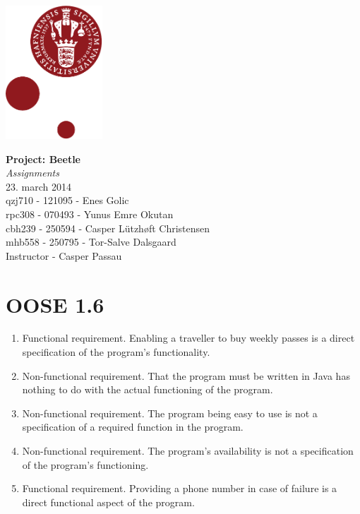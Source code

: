 \documentclass[12pt,a4paper]{article}
\begin{document}
	
	\begin{minipage}[b]{1.0\linewidth} 
		\includegraphics[height=50mm]{KULogo.pdf}
		
		\vspace*{-16ex}
		\vspace {35ex}
		\begin{center}
			{\huge \bf Project: Beetle} \\
			{\huge\textit {Assignments}}\vspace*{4ex} \\
			{\large 23. march 2014}\\
			\vspace*{2ex}
			qzj710 - 121095 - Enes Golic \\
			rpc308 - 070493 - Yunus Emre Okutan \\
			cbh239 - 250594 - Casper Lützhøft Christensen \\
			mhb558 - 250795 - Tor-Salve Dalsgaard\\
			\vspace*{1ex}
			Instructor - Casper Passau
			
		\end{center}
	\end{minipage}
	
\newpage

\section{OOSE 1.6}
\begin{enumerate}
\item Functional requirement. Enabling a traveller to buy weekly passes is a direct specification of the program’s functionality.
\item Non-functional requirement. That the program must be written in Java has nothing to do with the actual functioning of the program.
\item Non-functional requirement. The program being easy to use is not a specification of a required function in the program.
\item Non-functional requirement. The program’s availability is not a specification of the program’s functioning.
\item Functional requirement. Providing a phone number in case of failure is a direct functional aspect of the program.	
\end{enumerate}
\end{document}
